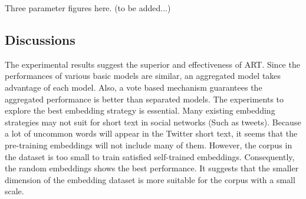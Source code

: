 Three parameter figures here. (to be added...)

\subsection{Discussions}
The experimental results suggest the superior and effectiveness of ART. Since the performances of various basic models are similar, an aggregated model takes advantage of each model. Also, a vote based mechanism guarantees the aggregated performance is better than separated models. The experiments to explore the best embedding strategy is essential. Many existing embedding strategies may not suit for short text in social networks (Such as tweets). Because a lot of uncommon words will appear in the Twitter short text, it seems that the pre-training embeddings will not include many of them. However, the corpus in the dataset is too small to train satisfied self-trained embeddings. Consequently, the random embeddings shows the best performance. It suggests that the smaller dimension of the embedding dataset is more suitable for the corpus with a small scale.

